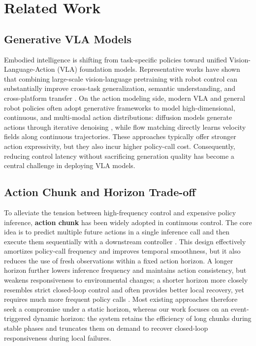 \section{Related Work}
\label{app:related_work}

\subsection{Generative VLA Models}
Embodied intelligence is shifting from task-specific policies toward unified Vision-Language-Action (VLA) foundation models. Representative works have shown that combining large-scale vision-language pretraining with robot control can substantially improve cross-task generalization, semantic understanding, and cross-platform transfer \cite{o2024open,black2024pi_0,zitkovich2023rt,kim2024openvla,ghosh2024octo,li2023vision,bjorck2025gr00t,pertsch2025fast,song2025accelerating}. On the action modeling side, modern VLA and general robot policies often adopt generative frameworks to model high-dimensional, continuous, and multi-modal action distributions: diffusion models generate actions through iterative denoising \cite{chi2025diffusion,wen2025diffusionvla,black2024pi_0,chen2025fast,li2025cogvla,zhao2025cot,hou2025dita,kim2025fine,song2025hume}, while flow matching directly learns velocity fields along continuous trajectories. These approaches typically offer stronger action expressivity, but they also incur higher policy-call cost\cite{wang2024one}. Consequently, reducing control latency without sacrificing generation quality has become a central challenge in deploying VLA models.

\subsection{Action Chunk and Horizon Trade-off}
To alleviate the tension between high-frequency control and expensive policy inference, \textbf{action chunk} has been widely adopted in continuous control. The core idea is to predict multiple future actions in a single inference call and then execute them sequentially with a downstream controller \cite{chi2025diffusion,zhao2023act,black2024pi_0,shukor2025smolvla,bjorck2025gr00t,wang2025sigma,driess2025knowledge}. This design effectively amortizes policy-call frequency and improves temporal smoothness, but it also reduces the use of fresh observations within a fixed action horizon. A longer horizon further lowers inference frequency and maintains action consistency, but weakens responsiveness to environmental changes; a shorter horizon more closely resembles strict closed-loop control and often provides better local recovery, yet requires much more frequent policy calls \cite{jing2025mixture,zhangaction,liu2024bidirectional,khan2025test,so2025improving,fu2025deep,zhao2026action,liu2026long}. Most existing approaches therefore seek a compromise under a static horizon, whereas our work focuses on an event-triggered dynamic horizon: the system retains the efficiency of long chunks during stable phases and truncates them on demand to recover closed-loop responsiveness during local failures.

